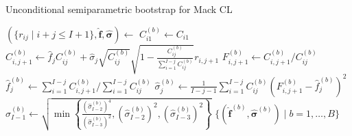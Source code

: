 \documentclass[a4paper]{book}
\begin{document}
\begin{algorithm}[!htb]
  \caption{Unconditional semiparametric bootstrap for Mack CL} 
  \label{alg:uncond-semiparam-mack}
  \begin{algorithmic} 
    \vspace{5pt}
    \State $(\{ r_{ij} \mid i + j \leq I + 1 \}, \bm{\widehat{f}}, \bm{\widehat{\sigma}}) \gets$  
    \vspace{5pt}
        \vspace{5pt}
        \State $C^{(b)}_{i1} \gets C_{i1}$
        \vspace{5pt}
      \EndFor
          \vspace{5pt}
          \State $C^{(b)}_{i, j + 1} \gets \widehat{f}_j C^{(b)}_{ij} + \widehat{\sigma}_j \sqrt{C^{(b)}_{ij}} \sqrt{1 - \frac{{C^{(b)}_{ij}}}{\sum_{i = 1}^{I - j} C^{(b)}_{ij}}} r_{i, j + 1}$
          \vspace{5pt}
          \State $\displaystyle F^{(b)}_{i, j + 1} \gets C^{(b)}_{i, j + 1} / C^{(b)}_{ij}$
          \vspace{5pt}
        \EndFor
        \vspace{5pt}
        \State $\widehat{f}^{(b)}_j \gets \sum_{i = 1}^{I - j} C^{(b)}_{i, j + 1} / \sum_{i = 1}^{I - j} C^{(b)}_{ij}$
        \vspace{5pt}
          \State $\displaystyle \widehat{\sigma}^{(b)}_j \gets \frac{1}{I - j - 1}\sum_{i = 1}^{I-j} C^{(b)}_{ij}\left( F^{(b)}_{i, j + 1} - \widehat{f}^{(b)}_j \right)^2$
        \Else
          \vspace{5pt}
          \State $\widehat{\sigma}^{(b)}_{I - 1} \gets \sqrt{\min{ \left \{ \displaystyle \frac{(\widehat{\sigma}^{(b)}_{I - 2})^4}{(\widehat{\sigma}^{(b)}_{I - 3})^2}, (\widehat{\sigma}^{(b)}_{I - 2})^2, (\widehat{\sigma}^{(b)}_{I - 3})^2 \right \} }}$
          \vspace{5pt}
        \EndIf
      \EndFor
      \vspace{5pt}
    \EndFor
    \State \Return $\{ (\widehat{\bm{f}}^{(b)}, \widehat{\bm{\sigma}}^{(b)}) \mid b = 1, \dots, B \}$
  \end{algorithmic}
\end{algorithm}
\end{document}
